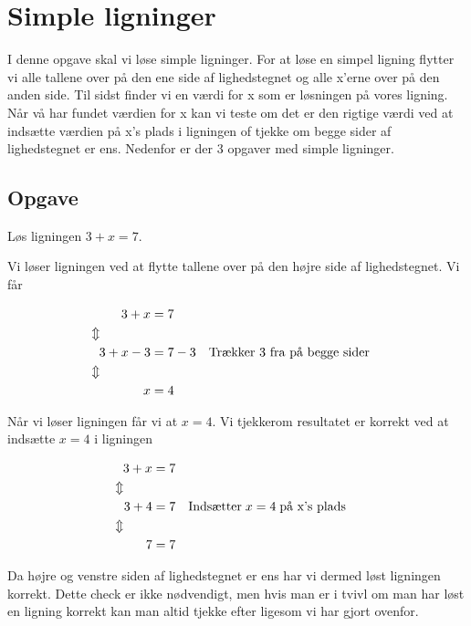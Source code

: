 \section{Simple ligninger}

I denne opgave skal vi løse simple ligninger. For at løse en simpel ligning flytter vi alle tallene over på den ene side af lighedstegnet og alle x'erne over på den anden side. Til sidst finder vi en værdi for x som er løsningen på vores ligning. Når vå har fundet værdien for x kan vi teste om det er den rigtige værdi ved at indsætte værdien på x's plads i ligningen of tjekke om begge sider af lighedstegnet er ens. Nedenfor er der 3 opgaver med simple ligninger.


\subsection{Opgave}
Løs ligningen $3 + x = 7$.

Vi løser ligningen ved at flytte tallene over på den højre side af lighedstegnet. Vi får

\begin{align*}
3 + x &= 7\\
\Updownarrow \hspace*{14mm} &\\
3 + x - 3 &= 7 - 3 && \text{Trækker 3 fra på begge sider}\\ 
\Updownarrow \hspace*{14mm} &\\
x &= 4
\end{align*}

Når vi løser ligningen får vi at $x = 4$. Vi tjekkerom resultatet er korrekt ved at indsætte $x = 4$ i ligningen

\begin{align*}
3 + x &= 7\\
\Updownarrow \hspace*{8mm} &\\
3 + 4 &= 7 && \text{Indsætter} \hspace*{1mm} x = 4 \hspace*{1mm} \text{på x's plads}\\
\Updownarrow \hspace*{8mm} &\\
7 &= 7
\end{align*}

Da højre og venstre siden af lighedstegnet er ens har vi dermed løst ligningen korrekt. Dette check er ikke nødvendigt, men hvis man er i tvivl om man har løst en ligning korrekt kan man altid tjekke efter ligesom vi har gjort ovenfor.




